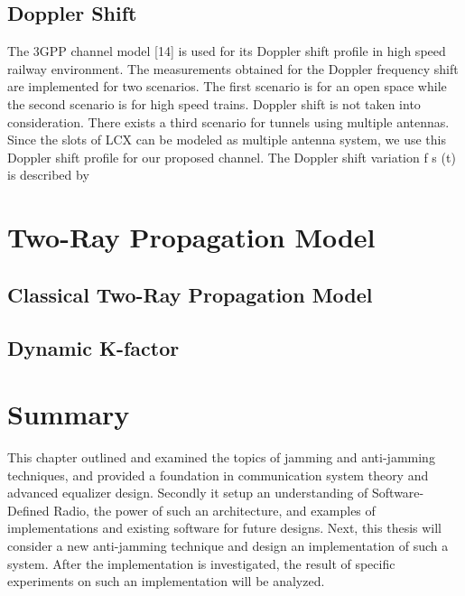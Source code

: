 \subsection{Doppler Shift}
The 3GPP channel model [14] is used for its Doppler shift profile in high speed railway environment. The measurements
obtained for the Doppler frequency shift are implemented for two scenarios. The first scenario is for an open space while
the second scenario is for high speed trains. Doppler shift is not taken into consideration. There exists a third scenario for
tunnels using multiple antennas. Since the slots of LCX can be modeled as multiple antenna system, we use this Doppler shift
profile for our proposed channel. The Doppler shift variation f s (t) is described by

\section{Two-Ray Propagation Model}

\subsection{Classical Two-Ray Propagation Model}



\subsection{Dynamic K-factor}

\section{Summary}
This chapter outlined and examined the topics of jamming and anti-jamming techniques, and provided a foundation in communication system theory and advanced equalizer design.  Secondly it setup an understanding of Software-Defined Radio, the power of such an architecture, and examples of implementations and existing software for future designs.  Next, this thesis will consider a new anti-jamming technique and design an implementation of such a system.  After the implementation is investigated, the result of specific experiments on such an implementation will be analyzed.\\
